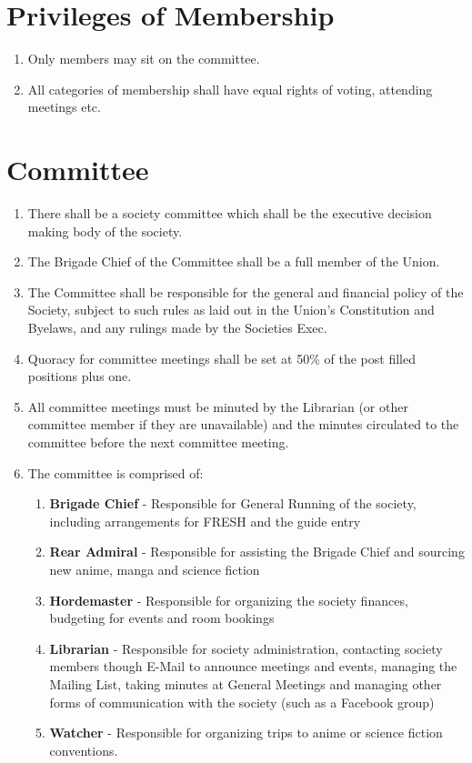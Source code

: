 \documentclass[a4paper,10pt]{article}
\begin{document}
\section{Privileges of Membership}
\begin{enumerate}
  \item Only members may sit on the committee.
  \item All categories of membership shall have equal rights of voting, attending meetings etc.
\end{enumerate}

\section{Committee}
\begin{enumerate}
  \item There shall be a society committee which shall be the executive decision making body of the society.
  \item The Brigade Chief of the Committee shall be a full member of the Union.
  \item The Committee shall be responsible for the general and financial policy of the Society, subject to such rules as laid out in the Union’s Constitution and Byelaws, and any rulings made by the Societies Exec.
  \item Quoracy for committee meetings shall be set at 50\% of the post filled positions plus one.
  \item All committee meetings must be minuted by the Librarian (or other committee member if they are unavailable) and the minutes circulated to the committee before the next committee meeting.
  \item The committee is comprised of:
  \begin{enumerate}
    \item \textbf{Brigade Chief} - Responsible for General Running of the society, including arrangements for FRESH and the guide entry
    \item \textbf{Rear Admiral} - Responsible for assisting the Brigade Chief and sourcing new anime, manga and science fiction
    \item \textbf{Hordemaster} - Responsible for organizing the society finances, budgeting for events and room bookings
    \item \textbf{Librarian} - Responsible for society administration, contacting society members though E-Mail to announce meetings and events, managing the Mailing List, taking minutes at General Meetings and managing other forms of communication with the society (such as a Facebook group)
    \item \textbf{Watcher} - Responsible for organizing trips to anime or science fiction conventions.
  \end{enumerate}
\end{enumerate}
\end{document}
